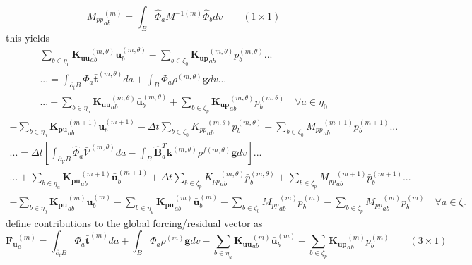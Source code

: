 \documentclass[11pt]{article} %
\begin{document}
\begin{equation}
	{M_{pp}}_{ab}^{(m)} = \int_B \hat{\Phi}_a M^{-1 (m)} \hat{\Phi}_b dv \qquad ( 1 \times 1 )
	\label{eq:Mpp}
\end{equation}
this yields
\begin{eqnarray}
	 \sum_{b \in \eta_0} \mathbf{K_{uu}}_{ab}^{(m,\theta)} \mathbf{u}_b^{(m,\theta)} - \sum_{b \in \zeta_0} \mathbf{K_{up}}_{ab}^{(m,\theta)} p_b^{(m,\theta)}  ... \nonumber \\
	... = \int_{\partial_t B} \Phi_a \bar{\mathbf{t}}^{(m,\theta)} da + \int_B \Phi_a \rho^{(m,\theta)} \mathbf{g} dv ... \nonumber \\
	... - \sum_{b \in \eta_u} \mathbf{K_{uu}}_{ab}^{(m,\theta)} \bar{\mathbf{u}}_b^{(m,\theta)} + \sum_{b \in \zeta_p}\mathbf{K_{up}}_{ab}^{(m,\theta)} \bar{p}_b^{(m,\theta)} \quad \forall a \in \eta_0
\end{eqnarray}
\begin{eqnarray}
	 - \sum_{b \in \eta_0} \mathbf{K_{pu}}_{ab}^{(m+1)} \mathbf{u}_b^{(m+1)} - \Delta t \sum_{b \in \zeta_0} {K_{pp}}_{ab}^{(m, \theta)} p_b^{(m,\theta)} - \sum_{b \in \zeta_0} {M_{pp}}_{ab}^{(m+1)} p_b^{(m+1)}  ... \nonumber \\
	... = \Delta t \left[ \int_{\partial_{\mathcal{V}} B} \hat{\Phi}_a \bar{\mathcal{V}}^{(m,\theta)} da - \int_B \hat{\mathbf{B}}_a^T \mathbf{k}^{(m,\theta)} \rho^{f (m,\theta)} \mathbf{g} dv \right] ... \nonumber \\
	... + \sum_{b \in \eta_u} \mathbf{K_{pu}}_{ab}^{(m+1)} \bar{\mathbf{u}}_b^{(m+1)} + \Delta t \sum_{b \in \zeta_p} {K_{pp}}_{ab}^{(m, \theta)} \bar{p}_b^{(m,\theta)} + \sum_{b \in \zeta_p} {M_{pp}}_{ab}^{(m+1)} \bar{p}_b^{(m+1)} ... \nonumber \\
	- \sum_{b \in \eta_0} \mathbf{K_{pu}}_{ab}^{(m)} \mathbf{u}_b^{(m)} - \sum_{b \in \eta_u} \mathbf{K_{pu}}_{ab}^{(m)} \bar{\mathbf{u}}_b^{(m)} - \sum_{b \in \zeta_0} {M_{pp}}_{ab}^{(m)} p_b^{(m)} - \sum_{b \in \zeta_p} {M_{pp}}_{ab}^{(m)} \bar{p}_b^{(m)} \quad \forall a \in \zeta_0
\end{eqnarray}
define contributions to the global forcing/residual vector as
\begin{equation}
	\mathbf{F_{u}}_{a}^{(m)} = \int_{\partial_t B} \Phi_a \bar{\mathbf{t}}^{(m)} da + \int_B \Phi_a \rho^{(m)} \mathbf{g} dv - \sum_{b \in \eta_u} \mathbf{K_{uu}}_{ab}^{(m)} \bar{\mathbf{u}}_b^{(m)} + \sum_{b \in \zeta_p}\mathbf{K_{up}}_{ab}^{(m)} \bar{p}_b^{(m)} \qquad ( 3 \times 1 )
	\label{eq:Fu}
\end{equation}
\end{document}
